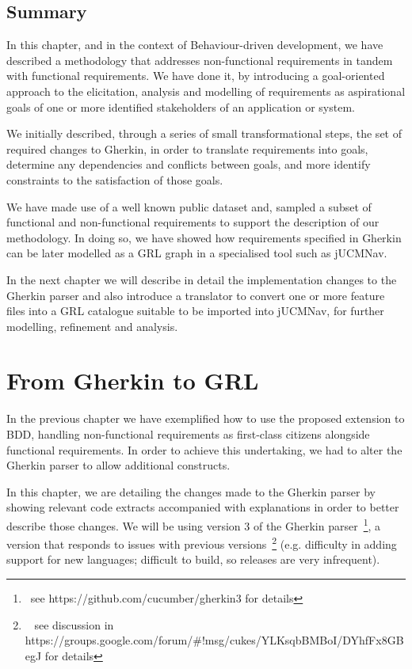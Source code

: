 \documentclass[dissertation,final]{softeng}
\newcommand{\nfrs}{non-functional requirements\xspace}
\begin{document}
\section{Summary}
In this chapter, and in the context of Behaviour-driven development, we have described a methodology that addresses \nfrs in tandem with functional requirements. We have done it, by introducing a goal-oriented approach to the elicitation, analysis and modelling of requirements as aspirational goals of one or more identified stakeholders of an application or system.

We initially described, through a series of small transformational steps, the set of required changes to Gherkin, in order to translate requirements into goals, determine any dependencies and conflicts between goals, and more identify constraints to the satisfaction of those goals.

We have made use of a well known public dataset and, sampled a subset of functional and non-functional requirements to support the description of our methodology. In doing so, we have showed how requirements specified in Gherkin can be later modelled as a GRL graph in a specialised tool such as jUCMNav.

In the next chapter we will describe in detail the implementation changes to the Gherkin parser and also introduce a translator to convert one or more feature files into a GRL catalogue suitable to be imported into jUCMNav, for further modelling, refinement and analysis.

\chapter{From Gherkin to GRL}
\label{ch:gherkin_redux}
In the previous chapter we have exemplified how to use the proposed extension to BDD, handling \nfrs as first-class citizens alongside functional requirements. In order to achieve this undertaking, we had to alter the Gherkin parser to allow additional constructs.

In this chapter, we are detailing the changes made to the Gherkin parser by showing relevant code extracts accompanied with explanations in order to better describe those changes. We will be using version 3 of the Gherkin parser~\footnote{~see https://github.com/cucumber/gherkin3 for details}, a version that responds to issues with previous versions~\footnote{~ see discussion in https://groups.google.com/forum/\#!msg/cukes/YLKsqbBMBoI/DYhfFx8GBegJ for details} (e.g. difficulty in adding support for new languages; difficult to build, so releases are very infrequent).
\end{document}
